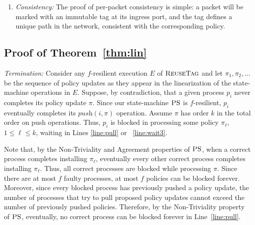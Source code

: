 \documentclass[11pt,pdftex,letter]{article}
\newcommand{\DPO}{\textsc{ReuseTag}}
\newcommand{\PS}{\textsc{PS}}
\begin{document}
\begin{appendix}
\begin{enumerate}
\item \emph{Consistency:} The proof of per-packet consistency is simple: a packet will be marked with an immutable
tag at its ingress port, and the tag defines a unique path in the
network, consistent with the corresponding policy. 
\end{enumerate}


\subsection{Proof of Theorem~\ref{thm:lin}}


\emph{Termination:} Consider any $f$-resilient execution $E$ of $\DPO$ and let $\pi_1,\pi_2,\ldots$ be the
sequence of policy updates as they appear in the
linearization of the state-machine operations in $E$.
Suppose, by contradiction, that a given process $p_i$ never completes
its policy update  $\pi$.
Since our state-machine $\PS$ is $f$-resilient, $p_i$ eventually completes its
$\textit{push}(i,\pi)$ operation.
Assume $\pi$ has order $k$ in the total order on push operations.
Thus, $p_i$ is blocked in processing some policy $\pi_{\ell}$, $1\leq \ell \leq
k$,  waiting in Lines \ref{line:pull} or ~\ref{line:wait3}.

Note that, by the Non-Triviality and Agreement properties of $\PS$,
when a correct process completes installing $\pi_{\ell}$,
eventually every other correct process completes installing $\pi_{\ell}$.
Thus, all correct processes are blocked while processing $\pi$.
Since there are at most $f$ faulty processes, at most $f$ policies can
be blocked forever.
Moreover, since every blocked process has previously pushed a policy
update, the number of processes that try to pull proposed policy
updates
cannot exceed the number of previously pushed policies.
Therefore, by the Non-Triviality property of $\PS$,
eventually, no correct process  can be blocked forever in
Line~\ref{line:pull}.



\end{appendix}
\end{document}
